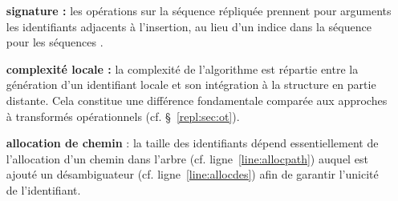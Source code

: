 \begin{itemize}
\item [\textbf{signature :}] les opérations sur la séquence répliquée prennent
  pour arguments les identifiants adjacents à l'insertion, au lieu d'un indice
  dans la séquence pour les séquences .
\end{itemize}

\begin{itemize}
\item [\textbf{complexité locale :}] la complexité de l'algorithme est répartie
  entre la génération d'un identifiant locale et son intégration à la structure
  en partie distante. Cela constitue une différence fondamentale comparée aux
  approches à transformés opérationnels (cf. §~\ref{repl:sec:ot}).
\item [\textbf{allocation de chemin} :] la taille des identifiants dépend
  essentiellement de l'allocation d'un chemin dans l'arbre
  (cf. ligne~\ref{line:allocpath}) auquel est ajouté un désambiguateur
  (cf. ligne~\ref{line:allocdes}) afin de garantir l'unicité de l'identifiant.
\end{itemize}


